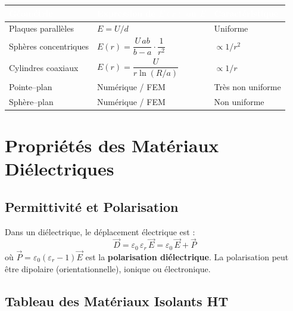 \documentclass[12pt, a4paper, twoside]{report}
\begin{document}
\begin{center}
\begin{tabularx}{\textwidth}{lXX}
\toprule
\rowcolor{darkblue}
\textcolor{white}{\textbf{Géométrie}} &
\textcolor{white}{\textbf{Expression de $E(r)$ ou $E$}} &
\textcolor{white}{\textbf{Caractéristique}} \\
\midrule
Plaques parallèles & $E = U/d$ & Uniforme \\
\rowcolor{lightgray}
Sphères concentriques & $E(r) = \dfrac{U\,ab}{b-a}\cdot\dfrac{1}{r^2}$ & $\propto 1/r^2$ \\
Cylindres coaxiaux & $E(r) = \dfrac{U}{r\ln(R/a)}$ & $\propto 1/r$ \\
\rowcolor{lightgray}
Pointe--plan & Numérique / FEM & Très non uniforme \\
Sphère--plan & Numérique / FEM & Non uniforme \\
\bottomrule
\end{tabularx}
\end{center}

\section{Propriétés des Matériaux Diélectriques}

\subsection{Permittivité et Polarisation}

Dans un diélectrique, le déplacement électrique est :
\begin{equation}
  \vec{D} = \varepsilon_0\,\varepsilon_r\,\vec{E} = \varepsilon_0\,\vec{E} + \vec{P}
\end{equation}
où $\vec{P} = \varepsilon_0(\varepsilon_r - 1)\vec{E}$ est la \textbf{polarisation diélectrique}.
La polarisation peut être dipolaire (orientationnelle), ionique ou électronique.

\subsection{Tableau des Matériaux Isolants HT}
\end{document}
